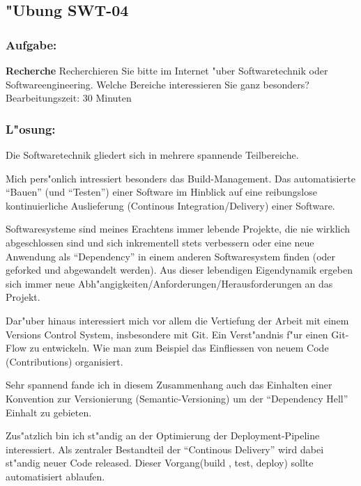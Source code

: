 \newpage
\subsection{"Ubung SWT-04}
\subsubsection*{Aufgabe:}

\begin{framed}
\textbf{Recherche}
\smallbreak
Recherchieren Sie bitte im Internet "uber Softwaretechnik oder Softwareengineering. Welche Bereiche interessieren Sie ganz besonders?
\bigbreak
\small Bearbeitungszeit: 30 Minuten
\end{framed}
\bigbreak
\bigbreak
\subsubsection*{L"osung:}

Die Softwaretechnik gliedert sich in mehrere spannende Teilbereiche.

Mich pers"onlich intressiert besonders das Build-Management. Das automatisierte ``Bauen'' (und ``Testen'') einer Software im Hinblick auf eine reibungslose kontinuierliche Auslieferung (Continous Integration/Delivery) einer Software.

Softwaresysteme sind meines Erachtens immer lebende Projekte, die nie wirklich abgeschlossen sind und sich inkrementell stets verbessern oder eine neue Anwendung als ``Dependency'' in einem anderen Softwaresystem finden (oder geforked und abgewandelt werden).
Aus dieser lebendigen Eigendynamik ergeben sich immer neue Abh"angigkeiten/Anforderungen/Herausforderungen an das Projekt.

Dar"uber hinaus interessiert mich vor allem die Vertiefung der Arbeit mit einem Versions Control System, insbesondere mit Git.
Ein Verst"andnis f"ur einen Git-Flow zu entwickeln. Wie man zum Beispiel das Einfliessen von neuem Code (Contributions) organisiert.

Sehr spannend fande ich in diesem Zusammenhang auch das Einhalten einer Konvention zur Versionierung (Semantic-Versioning) um der ``Dependency Hell'' Einhalt zu gebieten.

Zus"atzlich bin ich st"andig an der Optimierung der Deployment-Pipeline interessiert.
Als zentraler Bestandteil der ``Continous Delivery'' wird dabei st"andig neuer Code released. Dieser Vorgang(build , test, deploy) sollte automatisiert ablaufen.

